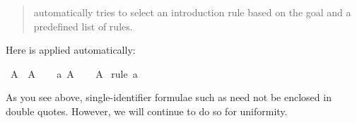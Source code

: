 \begin{isabellebody}
\begin{isamarkuptext}
\begin{quote}
 automatically tries to select an introduction rule
based on the goal and a predefined list of rules.  \end{quote} Here
 is applied automatically:%
\end{isamarkuptext}%
\isamarkuptrue%
\isamarkupfalse%
\ {}A\ {}\ A{}\isanewline
%
\isadelimproof
%
\endisadelimproof
%
\isatagproof
{}\isamarkupfalse%
\isanewline
\ \ \isamarkupfalse%
\ a{}\ A\isanewline
\ \ \isamarkupfalse%
\ A\ \isamarkupfalse%
{}rule\ a{}\isanewline
{}\isamarkupfalse%
%
\endisatagproof
{\isafoldproof}%
%
\isadelimproof
%
\endisadelimproof
%
\begin{isamarkuptext}%
\noindent As you see above, single-identifier formulae such as 
need not be enclosed in double quotes. However, we will continue to do so for
uniformity.


\end{isamarkuptext}
\end{isabellebody}
